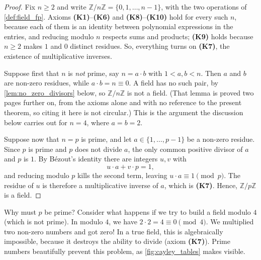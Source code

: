 \begin{proof}
Fix $n \ge 2$ and write $\mathbb{Z}/n\mathbb{Z} = \{0, 1, \dots, n-1\}$, with the two operations of \cref{def:field_fp}. Axioms \textbf{(K1)}--\textbf{(K6)} and \textbf{(K8)}--\textbf{(K10)} hold for every such $n$, because each of them is an identity between polynomial expressions in the entries, and reducing modulo $n$ respects sums and products; \textbf{(K9)} holds because $n \ge 2$ makes $1$ and $0$ distinct residues. So, everything turns on \textbf{(K7)}, the existence of multiplicative inverses.

Suppose first that $n$ is \emph{not} prime, say $n = a \cdot b$ with $1 < a, b < n$. Then $a$ and $b$ are non-zero residues, while $a \cdot b = n \equiv 0$. A field has no such pair, by \cref{lem:no_zero_divisors} below, so $\mathbb{Z}/n\mathbb{Z}$ is not a field. (That lemma is proved two pages further on, from the axioms alone and with no reference to the present theorem, so citing it here is not circular.) This is the argument the discussion below carries out for $n = 4$, where $a = b = 2$.

Suppose now that $n = p$ is prime, and let $a \in \{1, \dots, p-1\}$ be a non-zero residue. Since $p$ is prime and $p$ does not divide $a$, the only common positive divisor of $a$ and $p$ is $1$. By Bézout's identity there are integers $u, v$ with
\[
    u \cdot a + v \cdot p = 1,
\]
and reducing modulo $p$ kills the second term, leaving $u \cdot a \equiv 1 \pmod p$. The residue of $u$ is therefore a multiplicative inverse of $a$, which is \textbf{(K7)}. Hence, $\mathbb{Z}/p\mathbb{Z}$ is a field.
\end{proof}

Why must $p$ be prime? Consider what happens if we try to build a field modulo $4$ (which is not prime). In modulo $4$, we have $2 \cdot 2 = 4 \equiv 0 \pmod 4$. We multiplied two non-zero numbers and got zero! In a true field, this is algebraically impossible, because it destroys the ability to divide (axiom \textbf{(K7)}). Prime numbers beautifully prevent this  problem, as \cref{fig:cayley_tables} makes visible.

